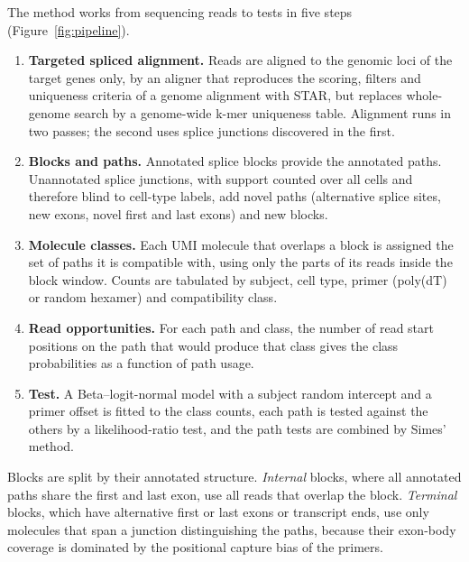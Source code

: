 \documentclass[11pt]{article}
\begin{document}
The method works from sequencing reads to tests in five steps (Figure~\ref{fig:pipeline}).
\begin{enumerate}[leftmargin=*]
  \item \textbf{Targeted spliced alignment.} Reads are aligned to the genomic loci of the target genes only, by an aligner that reproduces the scoring, filters and uniqueness criteria of a genome alignment with STAR, but replaces whole-genome search by a genome-wide k-mer uniqueness table. Alignment runs in two passes; the second uses splice junctions discovered in the first.
  \item \textbf{Blocks and paths.} Annotated splice blocks provide the annotated paths. Unannotated splice junctions, with support counted over all cells and therefore blind to cell-type labels, add novel paths (alternative splice sites, new exons, novel first and last exons) and new blocks.
  \item \textbf{Molecule classes.} Each UMI molecule that overlaps a block is assigned the set of paths it is compatible with, using only the parts of its reads inside the block window. Counts are tabulated by subject, cell type, primer (poly(dT) or random hexamer) and compatibility class.
  \item \textbf{Read opportunities.} For each path and class, the number of read start positions on the path that would produce that class gives the class probabilities as a function of path usage.
  \item \textbf{Test.} A Beta--logit-normal model with a subject random intercept and a primer offset is fitted to the class counts, each path is tested against the others by a likelihood-ratio test, and the path tests are combined by Simes' method.
\end{enumerate}
Blocks are split by their annotated structure. \emph{Internal} blocks, where all annotated paths share the first and last exon, use all reads that overlap the block. \emph{Terminal} blocks, which have alternative first or last exons or transcript ends, use only molecules that span a junction distinguishing the paths, because their exon-body coverage is dominated by the positional capture bias of the primers.
\end{document}
